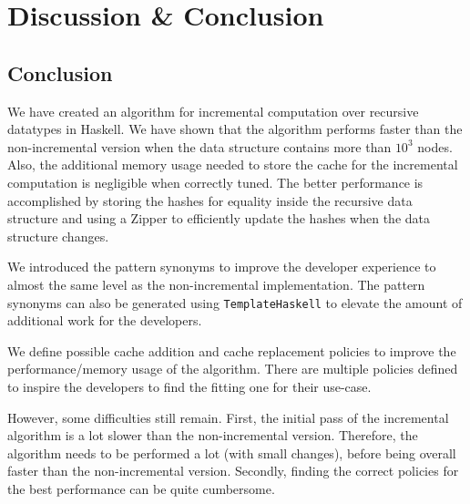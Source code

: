 \chapter{Discussion \& Conclusion}





\section{Conclusion}

We have created an algorithm for incremental computation over recursive datatypes in Haskell. We have shown that the algorithm performs faster than the non-incremental version when the data structure contains more than $10^3$ nodes. Also, the additional memory usage needed to store the cache for the incremental computation is negligible when correctly tuned. The better performance is accomplished by storing the hashes for equality inside the recursive data structure and using a Zipper to efficiently update the hashes when the data structure changes.

We introduced the pattern synonyms to improve the developer experience to almost the same level as the non-incremental implementation. The pattern synonyms can also be generated using \texttt{TemplateHaskell} to elevate the amount of additional work for the developers.

We define possible cache addition and cache replacement policies to improve the performance/memory usage of the algorithm. There are multiple policies defined to inspire the developers to find the fitting one for their use-case.

However, some difficulties still remain. First, the initial pass of the incremental algorithm is a lot slower than the non-incremental version. Therefore, the algorithm needs to be performed a lot (with small changes), before being overall faster than the non-incremental version. Secondly, finding the correct policies for the best performance can be quite cumbersome. 
